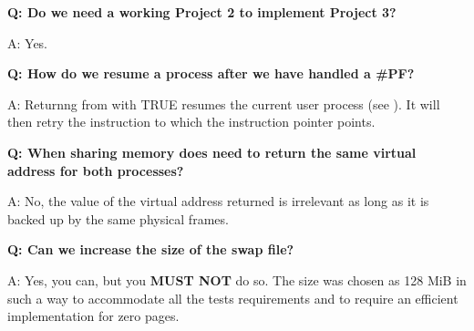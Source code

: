 \textbf{Q: Do we need a working Project 2 to implement Project 3?}

A: Yes.

\newline

\textbf{Q: How do we resume a process after we have handled a \#PF?}

A: Returnng from  with TRUE resumes the current user process (see
). It will then retry the instruction to which the instruction pointer
points.

\newline

\textbf{Q: When sharing memory does  need to return the same virtual
address for both processes?}

A: No, the value of the virtual address returned is irrelevant as long as it is backed up by the
same physical frames.

\newline

\textbf{Q: Can we increase the size of the swap file?}

A: Yes, you can, but you \textbf{MUST NOT} do so. The size was chosen as 128 MiB in such a way to
accommodate all the tests requirements and to require an efficient implementation for zero pages.